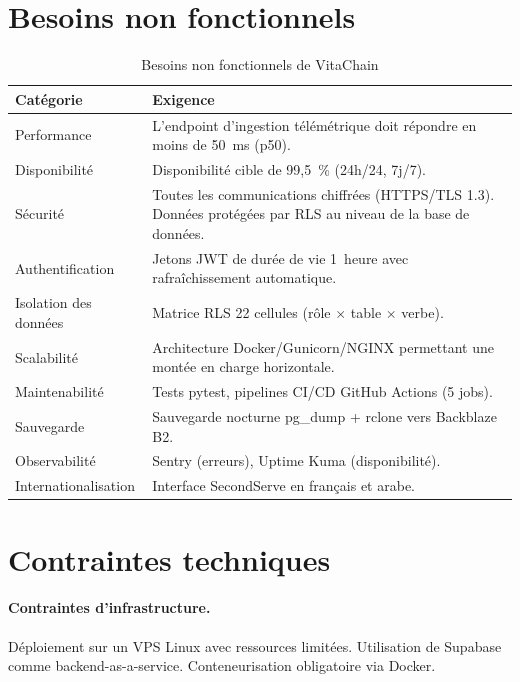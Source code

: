 \documentclass[12pt,a4paper]{report}
\begin{document}
\section{Besoins non fonctionnels}

\begin{table}[H]
  \centering
  \caption{Besoins non fonctionnels de VitaChain}
  \label{tab:bnf}
  \begin{tabularx}{\linewidth}{lX}
    \toprule
    \textbf{Catégorie} & \textbf{Exigence} \\
    \midrule
    Performance
      & L'endpoint d'ingestion télémétrique doit répondre en moins de 50~ms (p50). \\
    Disponibilité
      & Disponibilité cible de 99,5~\% (24h/24, 7j/7). \\
    Sécurité
      & Toutes les communications chiffrées (HTTPS/TLS 1.3). Données protégées par
        RLS au niveau de la base de données. \\
    Authentification
      & Jetons JWT de durée de vie 1~heure avec rafraîchissement automatique. \\
    Isolation des données
      & Matrice RLS 22 cellules (rôle $\times$ table $\times$ verbe). \\
    Scalabilité
      & Architecture Docker/Gunicorn/NGINX permettant une montée en charge
        horizontale. \\
    Maintenabilité
      & Tests pytest, pipelines CI/CD GitHub Actions (5 jobs). \\
    Sauvegarde
      & Sauvegarde nocturne pg\_dump + rclone vers Backblaze B2. \\
    Observabilité
      & Sentry (erreurs), Uptime Kuma (disponibilité). \\
    Internationalisation
      & Interface SecondServe en français et arabe. \\
    \bottomrule
  \end{tabularx}
\end{table}

\section{Contraintes techniques}

\paragraph{Contraintes d'infrastructure.}
Déploiement sur un VPS Linux avec ressources limitées. Utilisation de Supabase comme
backend-as-a-service. Conteneurisation obligatoire via Docker.
\end{document}
